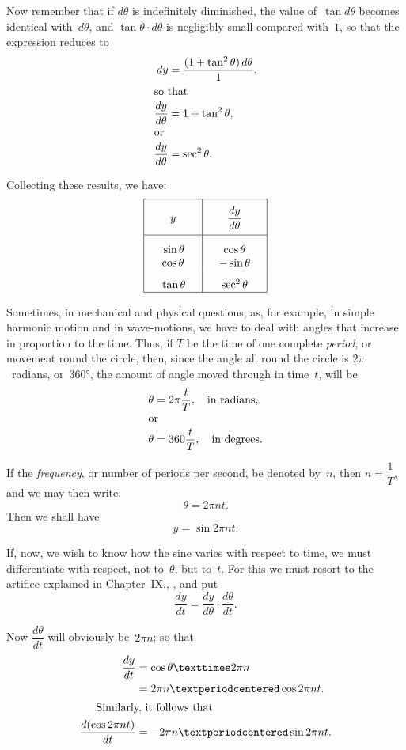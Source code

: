 \documentclass[12pt]{book}[2005/09/16]
\newcommand{\DPPageSep}[2]{\Pagelabel{#2}}
\newcommand{\Pagelabel}[1]
  {\phantomsection\label{#1}}
\newcommand{\Pageref}[2][p.]{%
  \ifthenelse{\not\equal{#1}{}}{%
    \hyperref[#2]{#1~\pageref*{#2}}%
  }{%
    \hyperref[#2]{\pageref{*#2}}%
  }%
}
\newcommand{\DStrut}{\rule[-12pt]{0pt}{32pt}}
\newcommand{\Strut}{\rule{0pt}{16pt}}
\begin{document}
Now remember that if $d\theta$ is indefinitely diminished,
the value of~$\tan d\theta$ becomes identical with~$d\theta$, and
$\tan\theta · d\theta$ is negligibly small compared with~$1$, so that
the expression reduces to
\begin{align*}
dy &= \frac{(1+\tan^2 \theta)\, d\theta}{1}, \\
\intertext{so that}
\frac{dy}{d\theta} &= 1 + \tan^2\theta, \\
\intertext{or}
\frac{dy}{d\theta} &= \sec^2 \theta.
\end{align*}

Collecting these results, we have:
\[
\begin{array}{|*{2}{>{\quad}c<{\quad}|}}
\hline
\DStrut y   & \dfrac{dy}{d\theta} \\
\hline
\Strut\sin\theta & \cos\theta \\
\cos\theta & -\sin\theta \\
\Strut\tan\theta & \sec^2 \theta\\
\hline
\end{array}
\]

Sometimes, in mechanical and physical questions,
as, for example, in simple harmonic motion and in
wave-motions, we have to deal with angles that increase
in proportion to the time. Thus, if $T$ be the
time of one complete \emph{period}, or movement round the
circle, then, since the angle all round the circle is $2\pi$~radians,
or~$360°$, the amount of angle moved through
in time~$t$, will be
\begin{align*}
\theta &= 2\pi\frac{t}{T},\quad \text{in radians,} \\
\intertext{or}
\theta &= 360\frac{t}{T},\quad \text{in degrees.}
\end{align*}
\DPPageSep{182.png}{170}%

If the \emph{frequency}, or number of periods per second,
be denoted by~$n$, then $n = \dfrac{1}{T}$, and we may then write:
\[
\theta=2\pi nt.
\]
Then we shall have
\[
y = \sin 2\pi nt.
\]

If, now, we wish to know how the sine varies with
respect to time, we must differentiate with respect, not
to~$\theta$, but to~$t$. For this we must resort to the artifice
explained in Chapter~IX., \Pageref{chap:IX}, and put %
\[
\frac{dy}{dt} = \frac{dy}{d\theta} · \frac{d\theta}{dt}.
\]

Now $\dfrac{d\theta}{dt}$ will obviously be~$2\pi n$; so that
\begin{align*}
\frac{dy}{dt} &= \cos \theta × 2\pi n \\
              &= 2\pi n · \cos 2\pi nt. \\
\intertext{\indent Similarly, it follows that}
\frac{d(\cos 2\pi nt)}{dt} &= -2\pi n · \sin 2\pi nt.
\end{align*}
\end{document}

